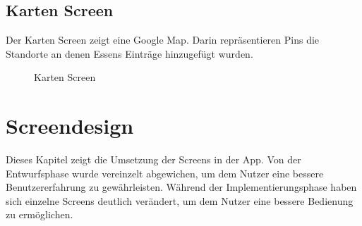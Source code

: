 \documentclass[
    DIV12,
    cleardouble=plain,
    headings=normal,
    pdftex,
    headexclude,footexclude,
    final
]{scrreprt}
\begin{document}
\section{Karten Screen}
Der Karten Screen zeigt eine Google Map. Darin repräsentieren Pins die Standorte an denen Essens Einträge hinzugefügt wurden.
\begin{figure}[H]
	\centering
	\caption{Karten Screen}
	\label{map}
\end{figure}




\newpage



\chapter{Screendesign}
Dieses Kapitel zeigt die Umsetzung der Screens in der App. Von der Entwurfsphase wurde vereinzelt abgewichen, um dem Nutzer eine bessere Benutzererfahrung zu gewährleisten. Während der Implementierungsphase haben sich einzelne Screens deutlich verändert, um dem Nutzer eine bessere Bedienung zu ermöglichen.
\end{document}
